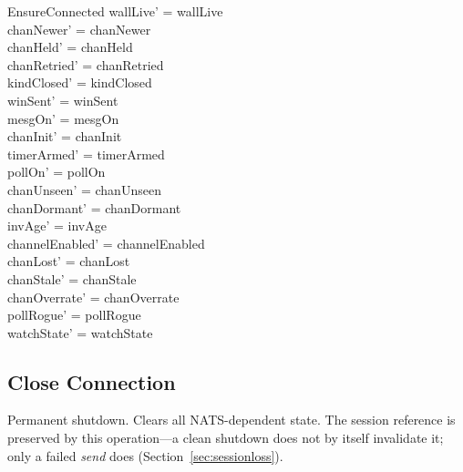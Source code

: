 \documentclass[a4paper,10pt,fleqn]{article}
\begin{document}
\begin{schema}{EnsureConnected}
  wallLive' = wallLive \\
  chanNewer' = chanNewer \\
  chanHeld' = chanHeld \\
  chanRetried' = chanRetried \\
  kindClosed' = kindClosed \\
  winSent' = winSent \\
  mesgOn' = mesgOn \\
  chanInit' = chanInit \\
  timerArmed' = timerArmed \\
  pollOn' = pollOn \\
  chanUnseen' = chanUnseen \\
  chanDormant' = chanDormant \\
  invAge' = invAge \\
  channelEnabled' = channelEnabled \\
  chanLost' = chanLost \\
  chanStale' = chanStale \\
  chanOverrate' = chanOverrate \\
  pollRogue' = pollRogue \\
  watchState' = watchState
\end{schema}

\subsection{Close Connection}

Permanent shutdown.  Clears all NATS-dependent state.  The session
reference is preserved by this operation---a clean shutdown does not
by itself invalidate it; only a failed \emph{send} does
(Section~\ref{sec:sessionloss}).
\end{document}
